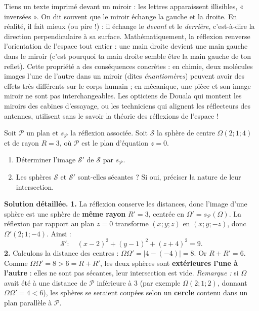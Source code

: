 \documentclass[11pt]{article}
\begin{document}
\begin{savaistu}
Tiens un texte imprimé devant un miroir : les lettres apparaissent illisibles, « inversées ». On dit souvent que le miroir échange la gauche et la droite. En réalité, il fait mieux (ou pire !) : il échange le \emph{devant} et le \emph{derrière}, c'est-à-dire la direction perpendiculaire à sa surface. Mathématiquement, la réflexion renverse l'orientation de l'espace tout entier : une main droite devient une main gauche dans le miroir (c'est pourquoi ta main droite semble être la main gauche de ton reflet). Cette propriété a des conséquences concrètes : en chimie, deux molécules images l'une de l'autre dans un miroir (dites \emph{énantiomères}) peuvent avoir des effets très différents sur le corps humain ; en mécanique, une pièce et son image miroir ne sont pas interchangeables. Les opticiens de Douala qui montent les miroirs des cabines d'essayage, ou les techniciens qui alignent les réflecteurs des antennes, utilisent sans le savoir la théorie des réflexions de l'espace !
\end{savaistu}

\begin{exoresolu}
Soit $\mathcal{P}$ un plan et $s_{\mathcal{P}}$ la réflexion associée. Soit $\mathcal{S}$ la sphère de centre $\Omega(2; 1; 4)$ et de rayon $R = 3$, où $\mathcal{P}$ est le plan d'équation $z = 0$.
\begin{enumerate}
\item Déterminer l'image $\mathcal{S}'$ de $\mathcal{S}$ par $s_{\mathcal{P}}$.
\item Les sphères $\mathcal{S}$ et $\mathcal{S}'$ sont-elles sécantes ? Si oui, préciser la nature de leur intersection.
\end{enumerate}
\tcblower
\textbf{Solution détaillée.}
\textbf{1.} La réflexion conserve les distances, donc l'image d'une sphère est une sphère de \textbf{même rayon} $R' = 3$, centrée en $\Omega' = s_{\mathcal{P}}(\Omega)$. La réflexion par rapport au plan $z = 0$ transforme $(x;y;z)$ en $(x;y;-z)$, donc $\Omega'(2; 1; -4)$. Ainsi :
\[ \mathcal{S}' : \quad (x-2)^2 + (y-1)^2 + (z+4)^2 = 9. \]
\textbf{2.} Calculons la distance des centres : $\Omega\Omega' = |4 - (-4)| = 8$. Or $R + R' = 6$. Comme $\Omega\Omega' = 8 > 6 = R + R'$, les deux sphères sont \textbf{extérieures l'une à l'autre} : elles ne sont pas sécantes, leur intersection est vide. \emph{Remarque :} si $\Omega$ avait été à une distance de $\mathcal{P}$ inférieure à $3$ (par exemple $\Omega(2;1;2)$, donnant $\Omega\Omega' = 4 < 6$), les sphères se seraient coupées selon un \textbf{cercle} contenu dans un plan parallèle à $\mathcal{P}$.
\end{exoresolu}
\end{document}
